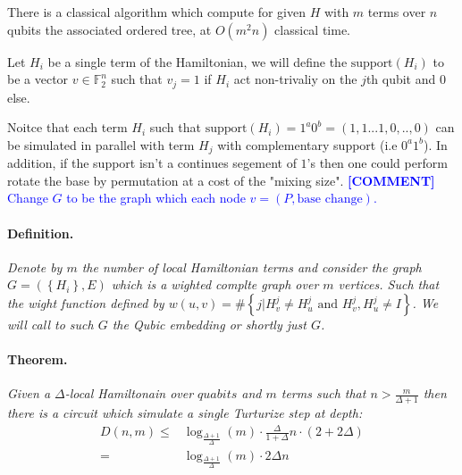\documentclass{article}
\newcommand{\commentt}[1]{\textcolor{blue}{ \textbf{[COMMENT]} #1}}
\newcommand{\ctt}[1]{\commentt{#1}}
\begin{document}
\begin{lemma}
  There is a classical algorithm which compute for given $H$ with $m$ terms over $n$ qubits the associated ordered tree, at $O\left( m^{2}n \right)$ classical time.  
\end{lemma}

\begin{definition}
  Let \(H_{i}\) be a single term of the Hamiltonian, we will define the \( \text{support}(H_{i}) \) to be a vector \( v \in \mathbb{F}^{n}_2\) such that \(v_j = 1\) if \(H_{i}\) act non-trivaliy on the \(j\)th qubit and \(0\) else.
\end{definition}


Noitce that each term \(H_i\) such that \(\text{support}(H_{i}) = 1^{a}0^{b} = (1,1...1,0,..,0)\) can be simulated in parallel with term \(H_j\) with complementary support (i.e \(0^{a}1^{b}\)).  
In addition, if the support isn't a continues segement of \(1\)'s then one could perform rotate the base by permutation at a cost of the "mixing size".   
\ctt{Change \(G\) to be the graph which each node \( v = \left(P, \text{base change}\right) \). }

\paragraph{Definition.} \textit{ Denote by $m$ the number of local Hamiltonian terms and consider the graph \(G = \left( \left\{ H_{i} \right\}, E \right)\) which is a wighted complte graph over $m$ vertices. Such that the wight function defined by \(w(u,v) = \#\left\{ j | H_{v}^{j} \neq H_{u}^{j} \text{ and } H_{v}^{j},H_{u}^{j}\neq I \right\} \). We will call to such \(G\) the Qubic embedding or shortly just \(G\). }    

\paragraph{Theorem.} \textit{Given a $\Delta$-local Hamiltonain over $quabits$ and $m$ terms such that $n > \frac{m}{\Delta + 1}$ then there is a circuit which simulate a single Turturize step at depth:}
\begin{equation*}
  \begin{split}
    D\left(n,m\right) \leq & \log_{\frac{\Delta+1}{\Delta}}\left(m\right)\cdot \frac{\Delta}{1+\Delta}n \cdot \left( 2 + 2\Delta \right) \\ = & \log_{\frac{\Delta+1}{\Delta}}\left(m\right)\cdot2\Delta n 
  \end{split}
\end{equation*}
\end{document}
